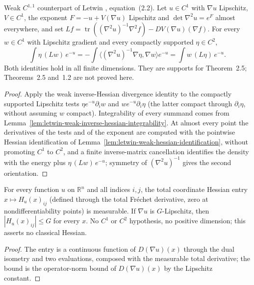 \begin{lemma}
  \label{lem:letwin-weak-generator-symmetry}
  \leanok
  Weak $C^{1,1}$ counterpart of Letwin \cite{Letwin2026QuadraticKLS}, equation~(2.2). Let $u\in C^1$ with
  $\nabla u$ Lipschitz, $V\in C^1$, the exponent $F=-u+V(\nabla u)$ Lipschitz and
  $\det\nabla^2u=e^{F}$ almost everywhere, and set $Lf=\operatorname{tr}((\nabla^2u)^{-1}\nabla^2f)-DV(\nabla u)(\nabla f)$.
  For every $w\in C^1$ with Lipschitz gradient and every compactly supported $\eta\in C^2$,
  \[
    \int \eta\,(Lw)\,e^{-u}=-\int\langle(\nabla^2u)^{-1}\nabla\eta,\nabla w\rangle e^{-u}
    =\int w\,(L\eta)\,e^{-u}.
  \]
  Both identities hold in all finite dimensions. They are supports for
  Theorem~2.5; Theorems~2.5 and~1.2 are not proved here.
\end{lemma}
\begin{proof}
  \leanok
  Apply the weak inverse-Hessian divergence identity to the compactly supported Lipschitz tests
  $\eta e^{-u}\partial_iw$ and $w e^{-u}\partial_i\eta$ (the latter compact through $\partial_i\eta$, without assuming
  $w$ compact). Integrability of every summand comes from
  Lemma~\ref{lem:letwin-weak-inverse-hessian-integrability}. At almost every point the derivatives of the tests and
  of the exponent are computed with the pointwise Hessian identification of
  Lemma~\ref{lem:letwin-weak-hessian-identification}, without promoting $C^1$ to $C^2$, and a finite inverse-matrix
  cancellation identifies the density with the energy plus $\eta\,(Lw)\,e^{-u}$; symmetry of $(\nabla^2u)^{-1}$ gives
  the second orientation.
\end{proof}

\begin{lemma}
  \label{lem:hessian-entry-measurable-bounded}
  \leanok
  For every function $u$ on $\mathbb R^n$ and all indices $i,j$, the total coordinate Hessian entry
  $x\mapsto H_u(x)_{ij}$ (defined through the total Fr\'echet derivative, zero at nondifferentiability points) is
  measurable. If $\nabla u$ is $G$-Lipschitz, then $|H_u(x)_{ij}|\le G$ for every $x$. No $C^1$ or $C^2$ hypothesis, no
  positive dimension; this asserts no classical Hessian.
\end{lemma}
\begin{proof}
  \leanok
  The entry is a continuous function of $D(\nabla u)(x)$ through the dual isometry and two evaluations, composed with the
  measurable total derivative; the bound is the operator-norm bound of $D(\nabla u)(x)$ by the Lipschitz constant.
\end{proof}

